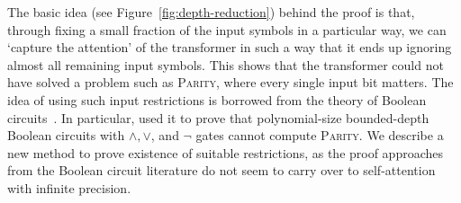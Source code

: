 \documentclass[11pt,a4paper]{article}
\begin{document}
The basic idea (see Figure~\ref{fig:depth-reduction}) behind the proof is that, through fixing a small fraction of the input symbols in a particular way, we can `capture the attention' of the transformer in such a way that it ends up ignoring almost all remaining input symbols.
This shows that the transformer could not have solved a problem such as \textsc{Parity}, where every single input bit matters.
The idea of using such input restrictions is borrowed from the theory of Boolean circuits~\cite{furst1984parity,yao1986separating,hastad1994optimal}.
In particular, \citet{furst1984parity} used it to prove that polynomial-size bounded-depth Boolean circuits with $\wedge, \vee$, and $\neg$ gates cannot compute \textsc{Parity}.
We describe a new method to prove existence of suitable restrictions, as the proof approaches from the Boolean circuit literature do not seem to carry over to self-attention with infinite precision. %




\end{document}
